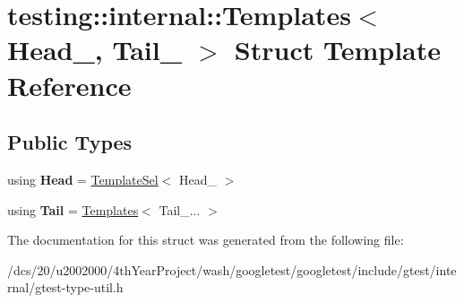 \hypertarget{structtesting_1_1internal_1_1Templates}{}\section{testing\+:\+:internal\+:\+:Templates$<$ Head\+\_\+, Tail\+\_\+ $>$ Struct Template Reference}
\label{structtesting_1_1internal_1_1Templates}
\subsection*{Public Types}
\begin{DoxyCompactItemize}
\item 
\mbox{\label{structtesting_1_1internal_1_1Templates_afd2098f3ace72dca2bfb0b3657f7f937}} 
using {\bfseries Head} = \mbox{\hyperlink{structtesting_1_1internal_1_1TemplateSel}{Template\+Sel}}$<$ Head\+\_\+ $>$
\item 
\mbox{\label{structtesting_1_1internal_1_1Templates_a462d57c3c1fc0a1bef26659dbd0c3b3d}} 
using {\bfseries Tail} = \mbox{\hyperlink{structtesting_1_1internal_1_1Templates}{Templates}}$<$ Tail\+\_\+... $>$
\end{DoxyCompactItemize}


The documentation for this struct was generated from the following file\+:\begin{DoxyCompactItemize}
\item 
/dcs/20/u2002000/4th\+Year\+Project/wash/googletest/googletest/include/gtest/internal/gtest-\/type-\/util.\+h\end{DoxyCompactItemize}

